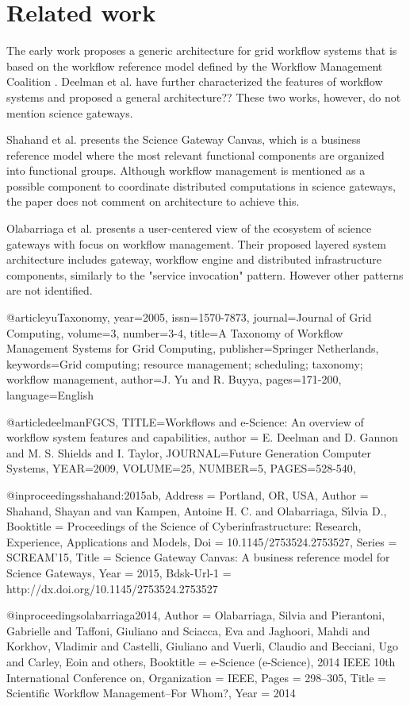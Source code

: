 \section{Related work}
\label{sec:related}

 
The early work \cite{yuTaxonomy} proposes a generic architecture for grid workflow systems that is based on the workflow reference model defined by the Workflow Management Coalition \cite{wfRefModel}. 
Deelman et al. \cite{deelmanFGCS} have further characterized the features of workflow systems and proposed a general architecture?? 
These two works, however, do not mention science gateways.

Shahand et al. \cite{shahand:2015ab} presents the Science Gateway Canvas, which is a business reference model where the most relevant functional components are organized into functional groups. Although workflow management is mentioned as a possible  component to coordinate distributed computations in science gateways, the paper does not comment on architecture to achieve this.

Olabarriaga et al. \cite{olabarriaga2014} presents a user-centered view of the ecosystem of science gateways with focus on workflow management. Their proposed layered system architecture includes gateway, workflow engine and distributed infrastructure components, similarly to the "service invocation" pattern. However other patterns are not identified.



@article{yuTaxonomy,
	year={2005},
	issn={1570-7873},
	journal={Journal of Grid Computing},
	volume={3},
	number={3-4},
	title={A Taxonomy of Workflow Management Systems for Grid Computing},
	publisher={Springer Netherlands},
	keywords={Grid computing; resource management; scheduling; taxonomy; workflow management},
	author={J. Yu  and R. Buyya},
	pages={171-200},
	language={English}
}

@article{deelmanFGCS,
	TITLE={Workflows and e-Science: An overview of workflow system features and capabilities}, 
	author    = {E. Deelman and
		D. Gannon and
		M. S. Shields and
		I. Taylor},
	JOURNAL={Future Generation Computer Systems}, 
	YEAR={2009},
	VOLUME={25},
	NUMBER={5},
	PAGES={528-540},
}

@inproceedings{shahand:2015ab,
	Address = {Portland, OR, USA},
	Author = {Shahand, Shayan and van Kampen, Antoine H. C. and Olabarriaga, S\'{\i}lvia D.},
	Booktitle = {{Proceedings of the Science of Cyberinfrastructure: Research, Experience, Applications and Models}},
	Doi = {10.1145/2753524.2753527},
	Series = {SCREAM'15},
	Title = {{Science Gateway Canvas: A business reference model for Science Gateways}},
	Year = {2015},
	Bdsk-Url-1 = {http://dx.doi.org/10.1145/2753524.2753527}}

@inproceedings{olabarriaga2014,
	Author = {Olabarriaga, Silvia and Pierantoni, Gabrielle and Taffoni, Giuliano and Sciacca, Eva and Jaghoori, Mahdi and Korkhov, Vladimir and Castelli, Giuliano and Vuerli, Claudio and Becciani, Ugo and Carley, Eoin and others},
	Booktitle = {e-Science (e-Science), 2014 IEEE 10th International Conference on},
	Organization = {IEEE},
	Pages = {298--305},
	Title = {Scientific Workflow Management--For Whom?},
	Year = {2014}}